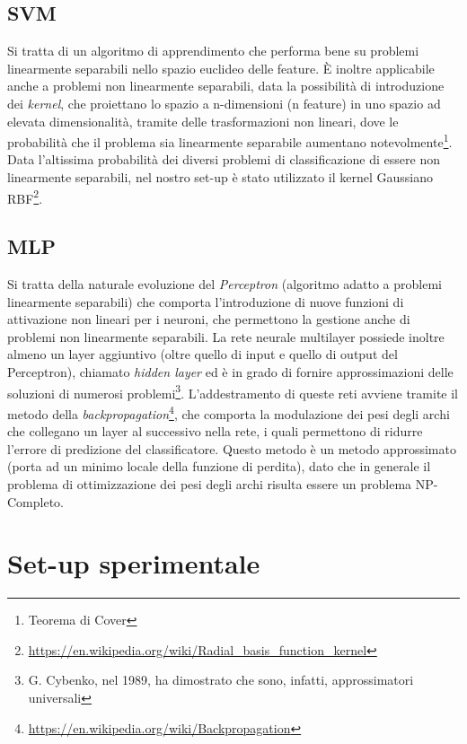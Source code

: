 \documentclass{article}
\begin{document}
\subsection{SVM}
Si tratta di un algoritmo di apprendimento che performa bene su problemi linearmente separabili nello spazio euclideo delle feature. È inoltre applicabile anche a problemi non linearmente separabili, data la possibilità di introduzione dei \emph{kernel}, che proiettano lo spazio a n-dimensioni (n feature) in uno spazio ad elevata dimensionalità, tramite delle trasformazioni non lineari, dove le probabilità che il problema sia linearmente separabile aumentano notevolmente\footnote{Teorema di Cover}.
\newline
\newline
Data l'altissima probabilità dei diversi problemi di classificazione di essere non linearmente separabili, nel nostro set-up è stato utilizzato il kernel Gaussiano RBF\footnote{\url{https://en.wikipedia.org/wiki/Radial_basis_function_kernel}}.

\subsection{MLP}
Si tratta della naturale evoluzione del \textit{Perceptron} (algoritmo adatto a problemi linearmente separabili) che comporta l'introduzione di nuove funzioni di attivazione non lineari per i neuroni, che permettono la gestione anche di problemi non linearmente separabili. La rete neurale multilayer possiede inoltre almeno un layer aggiuntivo (oltre quello di input e quello di output del Perceptron), chiamato \textit{hidden layer} ed è in grado di fornire approssimazioni delle soluzioni di numerosi problemi\footnote{G. Cybenko, nel 1989, ha dimostrato che sono, infatti, approssimatori universali}. L'addestramento di queste reti avviene tramite il metodo della \textit{backpropagation}\footnote{\url{https://en.wikipedia.org/wiki/Backpropagation}}, che comporta la modulazione dei pesi degli archi che collegano un layer al successivo nella rete, i quali permettono di ridurre l'errore di predizione del classificatore.
\newline
\newline
Questo metodo è un metodo approssimato (porta ad un minimo locale della funzione di perdita), dato che in generale il problema di ottimizzazione dei pesi degli archi risulta essere un problema NP-Completo.

\section{Set-up sperimentale}
\end{document}
